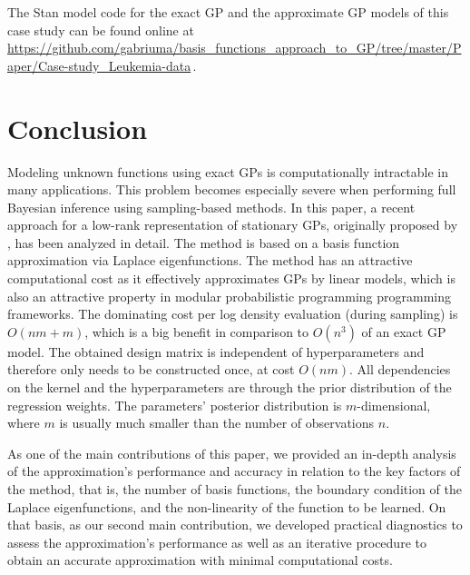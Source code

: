 The Stan model code for the exact GP and the approximate GP models of this case study can be found online at {\small \url{https://github.com/gabriuma/basis_functions_approach_to_GP/tree/master/Paper/Case-study_Leukemia-data}}\,.
%

\section{Conclusion}\label{sec_conclusion}

Modeling unknown functions using exact GPs is computationally intractable in many applications. This problem becomes especially severe when performing full Bayesian inference using sampling-based methods. In this paper, a recent approach for a low-rank representation of stationary GPs, originally proposed by \citet{solin2018hilbert}, has been analyzed in detail. The method is based on a basis function approximation via Laplace eigenfunctions. The method has an attractive computational cost as it effectively approximates GPs by linear models, which is also an attractive property in modular probabilistic programming programming frameworks. The dominating cost per log density evaluation (during sampling) is $O(nm+m)$, which is a big benefit in comparison to $O(n^3)$ of an exact GP model. The obtained design matrix is independent of hyperparameters and therefore only needs to be constructed once, at cost $O(nm)$. All dependencies on the kernel and the hyperparameters are through the prior distribution of the regression weights. The parameters' posterior distribution is $m$-dimensional, where $m$ is usually much smaller than the number of observations $n$. 

As one of the main contributions of this paper, we provided an in-depth analysis of the approximation's performance and accuracy in relation to the key factors of the method, that is, the number of basis functions, the boundary condition of the Laplace eigenfunctions, and the non-linearity of the function to be learned. On that basis, as our second main contribution, we developed practical diagnostics to assess the approximation's performance as well as an iterative procedure to obtain an accurate approximation with minimal computational costs. 


